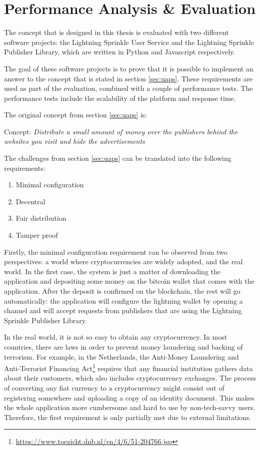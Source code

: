 \chapter{Performance Analysis \& Evaluation}
\label{cha:evaluation}

The concept that is designed in this thesis is evaluated with two different software projects: the Lightning Sprinkle User Service and the Lightning Sprinkle Publisher Library, which are written in Python and Javascript respectively. 

The goal of these software projects is to prove that it is possible to implement an answer to the concept that is stated in section \ref{sec:uaps}. These requirements are used as part of the evaluation, combined with a couple of performance tests. The performance tests include the scalability of the platform and response time. 

\noindent The original concept from section \ref{sec:uaps} is:

\vspace{1em}

Concept: \textit{Distribute a small amount of money over the publishers behind the websites you visit and hide the advertisements}

\vspace{1em}

\noindent The challenges from section \ref{sec:uaps} can be translated into the following requirements:
\begin{enumerate}
  \item Minimal configuration
  \item Decentral
  \item Fair distribution
  \item Tamper proof
\end{enumerate}

Firstly, the minimal configuration requirement can be observed from two perspectives: a world where cryptocurrencies are widely adopted, and the real world. In the first case, the system is just a matter of downloading the application and depositing some money on the bitcoin wallet that comes with the application. After the deposit is confirmed on the blockchain, the rest will go automatically: the application will configure the lightning wallet by opening a channel and will accept requests from publishers that are using the Lightning Sprinkle Publisher Library. 

In the real world, it is not so easy to obtain any cryptocurrency. In most countries, there are laws in order to prevent money laundering and backing of terrorism. For example, in the Netherlands, the Anti-Money Laundering and Anti-Terrorist Financing Act\footnote{\url{https://www.toezicht.dnb.nl/en/4/6/51-204766.jsp}} requires that any financial institution gathers data about their customers, which also includes cryptocurrency exchanges. The process of converting any fiat currency to a cryptocurrency might consist out of registering somewhere and uploading a copy of an identity document. This makes the whole application more cumbersome and hard to use by non-tech-savvy users. Therefore, the first requirement is only partially met due to external limitations.

